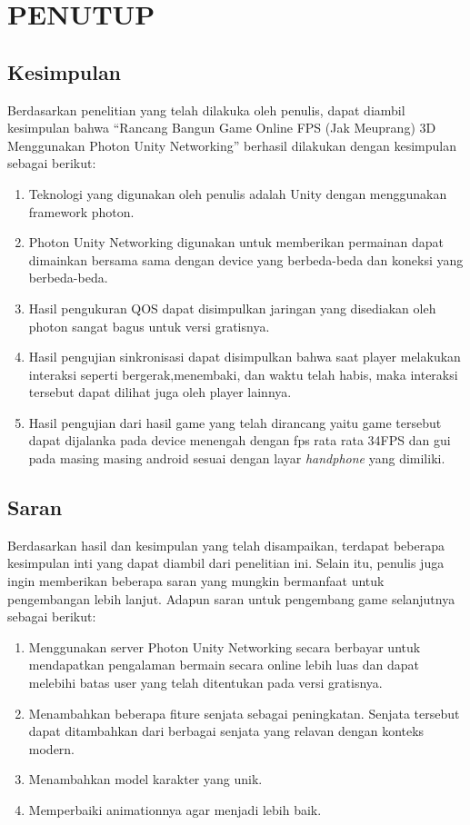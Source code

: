\chapter{PENUTUP}
\section{Kesimpulan}
\noindent

Berdasarkan penelitian yang telah dilakuka oleh penulis, dapat diambil kesimpulan bahwa “Rancang Bangun Game Online FPS (Jak Meuprang) 3D Menggunakan Photon Unity Networking” berhasil dilakukan dengan kesimpulan sebagai berikut:
\begin{enumerate}
    \item Teknologi yang digunakan oleh penulis adalah Unity dengan menggunakan framework photon.
    \item Photon Unity Networking digunakan untuk memberikan permainan dapat dimainkan bersama sama dengan device yang berbeda-beda dan koneksi yang berbeda-beda.
    \item Hasil pengukuran QOS dapat disimpulkan jaringan yang disediakan oleh photon sangat bagus untuk versi gratisnya.
    \item Hasil pengujian sinkronisasi dapat disimpulkan bahwa saat player melakukan interaksi seperti bergerak,menembaki, dan waktu telah habis, maka interaksi tersebut dapat dilihat juga oleh player lainnya.
    \item Hasil pengujian dari hasil game yang telah dirancang yaitu game tersebut dapat dijalanka pada device menengah dengan fps rata rata 34FPS dan gui pada masing masing android sesuai dengan layar \textit{handphone} yang dimiliki.
\end{enumerate}

\section{Saran}
\noindent

Berdasarkan hasil dan kesimpulan yang telah disampaikan, terdapat beberapa kesimpulan inti yang dapat diambil dari penelitian ini. Selain itu, penulis juga ingin memberikan beberapa saran yang mungkin bermanfaat untuk pengembangan lebih lanjut. Adapun saran untuk pengembang game selanjutnya sebagai berikut:
\begin{enumerate}
    \item Menggunakan server Photon Unity Networking secara berbayar untuk mendapatkan pengalaman bermain secara online lebih luas dan dapat melebihi batas user yang telah ditentukan pada versi gratisnya.
    \item Menambahkan beberapa fiture senjata sebagai peningkatan. Senjata tersebut dapat ditambahkan dari berbagai senjata yang relavan dengan konteks modern.
    \item Menambahkan model karakter yang unik.
    \item Memperbaiki animationnya agar menjadi lebih baik.
\end{enumerate}